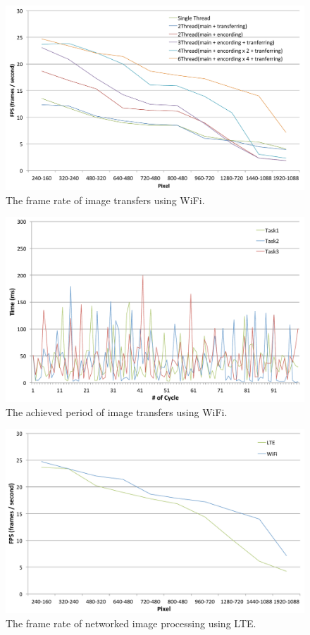 \begin{figure}[!t]
 \centering
 \includegraphics[width=0.8\hsize]{fig/No8_TIPiC_FPS_graph_WiFi.pdf}
 \caption{The frame rate of image transfers using WiFi.}
 \label{fig:no8}
\end{figure}

\begin{figure}[!t]
 \centering
 \includegraphics[width=0.8\hsize]{fig/No9_TIPiC_serv_cycle_WiFi.pdf}
 \caption{The achieved period of image transfers using WiFi.}
 \label{fig:no9}
\end{figure}

\begin{figure}[!t]
 \centering
 \includegraphics[width=0.8\hsize]{fig/No10_TIPiC_FPS_graph_LTE.pdf}
 \caption{The frame rate of networked image processing using LTE.}
 \label{fig:no10}
\end{figure}

